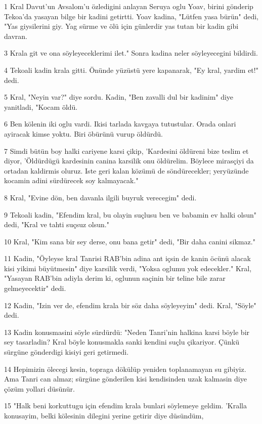 \par 1 Kral Davut'un Avsalom'u özledigini anlayan Seruya oglu Yoav, birini gönderip Tekoa'da yasayan bilge bir kadini getirtti. Yoav kadina, "Lütfen yasa bürün" dedi, "Yas giysilerini giy. Yag sürme ve ölü için günlerdir yas tutan bir kadin gibi davran.
\par 3 Krala git ve ona söyleyeceklerimi ilet." Sonra kadina neler söyleyecegini bildirdi.
\par 4 Tekoali kadin krala gitti. Önünde yüzüstü yere kapanarak, "Ey kral, yardim et!" dedi.
\par 5 Kral, "Neyin var?" diye sordu. Kadin, "Ben zavalli dul bir kadinim" diye yanitladi, "Kocam öldü.
\par 6 Ben kölenin iki oglu vardi. Ikisi tarlada kavgaya tutustular. Orada onlari ayiracak kimse yoktu. Biri öbürünü vurup öldürdü.
\par 7 Simdi bütün boy halki cariyene karsi çikip, 'Kardesini öldüreni bize teslim et diyor, 'Öldürdügü kardesinin canina karsilik onu öldürelim. Böylece mirasçiyi da ortadan kaldirmis oluruz. Iste geri kalan közümü de söndürecekler; yeryüzünde kocamin adini sürdürecek soy kalmayacak."
\par 8 Kral, "Evine dön, ben davanla ilgili buyruk verecegim" dedi.
\par 9 Tekoali kadin, "Efendim kral, bu olayin suçlusu ben ve babamin ev halki olsun" dedi, "Kral ve tahti suçsuz olsun."
\par 10 Kral, "Kim sana bir sey derse, onu bana getir" dedi, "Bir daha canini sikmaz."
\par 11 Kadin, "Öyleyse kral Tanrisi RAB'bin adina ant içsin de kanin öcünü alacak kisi yikimi büyütmesin" diye karsilik verdi, "Yoksa oglumu yok edecekler." Kral, "Yasayan RAB'bin adiyla derim ki, oglunun saçinin bir teline bile zarar gelmeyecektir" dedi.
\par 12 Kadin, "Izin ver de, efendim krala bir söz daha söyleyeyim" dedi. Kral, "Söyle" dedi.
\par 13 Kadin konusmasini söyle sürdürdü: "Neden Tanri'nin halkina karsi böyle bir sey tasarladin? Kral böyle konusmakla sanki kendini suçlu çikariyor. Çünkü sürgüne gönderdigi kisiyi geri getirmedi.
\par 14 Hepimizin ölecegi kesin, topraga dökülüp yeniden toplanamayan su gibiyiz. Ama Tanri can almaz; sürgüne gönderilen kisi kendisinden uzak kalmasin diye çözüm yollari düsünür.
\par 15 "Halk beni korkuttugu için efendim krala bunlari söylemeye geldim. 'Kralla konusayim, belki kölesinin dilegini yerine getirir diye düsündüm,
